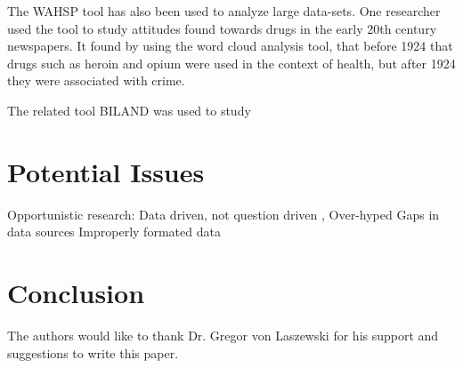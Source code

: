 \documentclass[sigconf]{acmart}
\begin{document}
The WAHSP tool has also been used to analyze large data-sets. One researcher used the tool to study attitudes found towards drugs in the early 20th century newspapers. It found by using the word cloud analysis tool, that before  1924 that drugs such as heroin and opium were used in the context of health, but after 1924 they were associated with crime. 

The related tool BILAND was used to study 

\section{Potential Issues}
Opportunistic research: Data driven, not question driven \cite{bigdatacritique}, \cite{digitalrepublicletters}
Over-hyped
Gaps in data sources
Improperly formated data\cite{digitalrepublicletters}


\section{Conclusion}

\begin{acks}

  The authors would like to thank Dr. Gregor von Laszewski for his
  support and suggestions to write this paper.

\end{acks}


 


\end{document}

